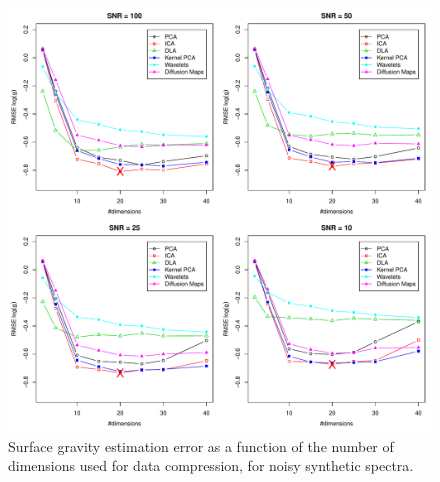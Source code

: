 \documentclass[a4paper,fleqn,usenatbib]{mnras}
\begin{document}
{{{\begin{figure}
\centering\includegraphics[width=\textwidth]{flamesHR10_Logg_log_BestSVM_N-RMSE_test.pdf}
\caption{Surface gravity estimation error as a function of the number of
  dimensions used for data compression, for noisy synthetic
  spectra.}
\label{fig:04}
\end{figure}


}}}
\end{document}
